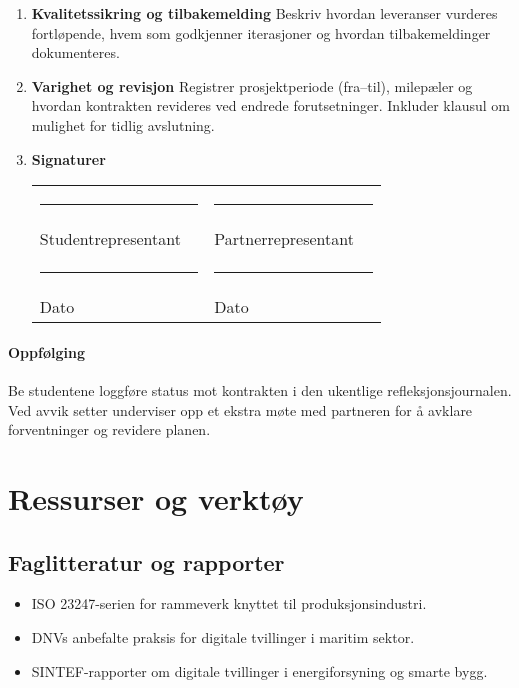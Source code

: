 \begin{enumerate}
    \item \textbf{Kvalitetssikring og tilbakemelding}\newline
    Beskriv hvordan leveranser vurderes fortløpende, hvem som godkjenner iterasjoner og hvordan tilbakemeldinger dokumenteres.

    \item \textbf{Varighet og revisjon}\newline
    Registrer prosjektperiode (fra--til), milepæler og hvordan kontrakten revideres ved endrede forutsetninger. Inkluder klausul om mulighet for tidlig avslutning.

    \item \textbf{Signaturer}\newline
    \begin{tabular}{p{0.45\linewidth}p{0.45\linewidth}}
        \rule{0.45\linewidth}{0.4pt} & \rule{0.45\linewidth}{0.4pt}\\
        Studentrepresentant & Partnerrepresentant\\[1.0em]
        \rule{0.45\linewidth}{0.4pt} & \rule{0.45\linewidth}{0.4pt}\\
        Dato & Dato\\
    \end{tabular}
\end{enumerate}

\paragraph{Oppfølging}
Be studentene loggføre status mot kontrakten i den ukentlige refleksjonsjournalen. Ved avvik setter underviser opp et ekstra møte med partneren for å avklare forventninger og revidere planen.

\section{Ressurser og verktøy}
\subsection{Faglitteratur og rapporter}
\begin{itemize}
    \item ISO 23247-serien for rammeverk knyttet til produksjonsindustri.
    \item DNVs anbefalte praksis for digitale tvillinger i maritim sektor.
    \item SINTEF-rapporter om digitale tvillinger i energiforsyning og smarte bygg.
\end{itemize}

